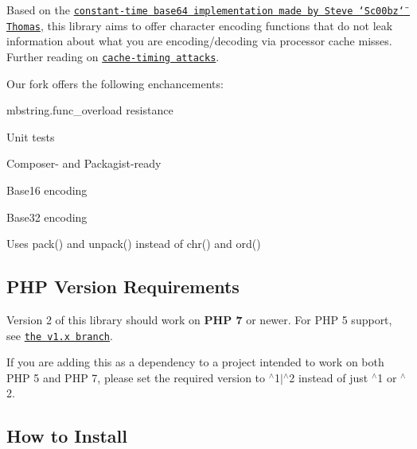 \href{https://travis-ci.org/paragonie/constant_time_encoding}{\tt } \href{https://packagist.org/packages/paragonie/constant_time_encoding}{\tt } \href{https://packagist.org/packages/paragonie/constant_time_encoding}{\tt } \href{https://packagist.org/packages/paragonie/constant_time_encoding}{\tt } \href{https://packagist.org/packages/paragonie/constant_time_encoding}{\tt }

Based on the \href{https://github.com/Sc00bz/ConstTimeEncoding}{\tt constant-\/time base64 implementation made by Steve \char`\"{}\+Sc00bz\char`\"{} Thomas}, this library aims to offer character encoding functions that do not leak information about what you are encoding/decoding via processor cache misses. Further reading on \href{http://blog.ircmaxell.com/2014/11/its-all-about-time.html}{\tt cache-\/timing attacks}.

Our fork offers the following enchancements\+:


\begin{DoxyItemize}
\item {\ttfamily mbstring.\+func\+\_\+overload} resistance
\item Unit tests
\item Composer-\/ and Packagist-\/ready
\item Base16 encoding
\item Base32 encoding
\item Uses {\ttfamily pack()} and {\ttfamily unpack()} instead of {\ttfamily chr()} and {\ttfamily ord()}
\end{DoxyItemize}

\subsection*{P\+HP Version Requirements}

Version 2 of this library should work on {\bfseries P\+HP 7} or newer. For P\+HP 5 support, see \href{https://github.com/paragonie/constant_time_encoding/tree/v1.x}{\tt the v1.\+x branch}.

If you are adding this as a dependency to a project intended to work on both P\+HP 5 and P\+HP 7, please set the required version to {\ttfamily $^\wedge$1$\vert$$^\wedge$2} instead of just {\ttfamily $^\wedge$1} or {\ttfamily $^\wedge$2}.

\subsection*{How to Install}


